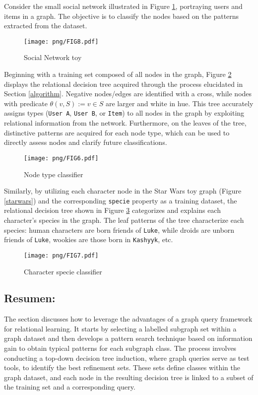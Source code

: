 \documentclass{article}%
\begin{document}
Consider the small social network illustrated in Figure \ref{grafo1}, portraying users and items in a graph. The objective is to classify the nodes based on the patterns extracted from the dataset.

\begin{figure}[h!]
  \centering
  \texttt{[image: png/FIG8.pdf]}
  \caption{Social Network toy}
  \label{grafo1}
\end{figure}

Beginning with a training set composed of all nodes in the graph, Figure \ref{social1} displays the relational decision tree acquired through the process elucidated in Section \ref{algorithm}. Negative nodes/edges are identified with a cross, while nodes with predicate $\theta(v,S) := v \in S$ are larger and white in hue. This tree accurately assigns types (\texttt{User A}, \texttt{User B}, or \texttt{Item}) to all nodes in the graph by exploiting relational information from the network. Furthermore, on the leaves of the tree, distinctive patterns are acquired for each node type, which can be used to directly assess nodes and clarify future classifications. 

\begin{figure}[h!]
	\centering
	\texttt{[image: png/FIG6.pdf]}
	\caption{Node type classifier}
	\label{social1}
\end{figure}

Similarly, by utilizing each character node in the Star Wars toy graph (Figure \ref{starwars}) and the corresponding \texttt{specie} property as a training dataset, the relational decision tree shown in Figure \ref{droid} categorizes and explains each character's species in the graph. The leaf patterns of the tree characterize each species: human characters are born friends of \texttt{Luke}, while droids are unborn friends of \texttt{Luke}, wookies are those born in \texttt{Kashyyk}, etc.

\begin{figure}[htb]
    \begin{center}
        \texttt{[image: png/FIG7.pdf]}
    \end{center}
	\caption{Character specie classifier}
	    \label{droid}
\end{figure}%
\subsection{Resumen:}%
\label{subsec:Resumen}%
The section discusses how to leverage the advantages of a graph query framework for relational learning. It starts by selecting a labelled subgraph set within a graph dataset and then develops a pattern search technique based on information gain to obtain typical patterns for each subgraph class. The process involves conducting a top-down decision tree induction, where graph queries serve as test tools, to identify the best refinement sets. These sets define classes within the graph dataset, and each node in the resulting decision tree is linked to a subset of the training set and a corresponding query.
\end{document}
